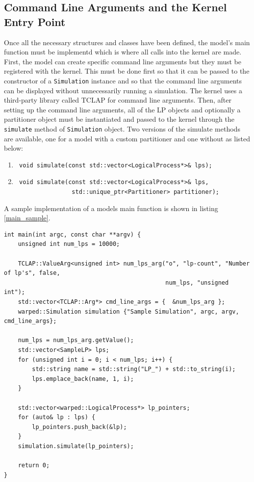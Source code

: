 \documentclass[11pt]{book}
\begin{document}
\subsection{Command Line Arguments and the Kernel Entry Point}

Once all the necessary structures and classes have been defined, the model's main function
must be implementd which is where all calls into the kernel are made. First, the model can create
specific command line arguments but they must be registered with the kernel. This must be done
first so that it can be passed to the constructor of a \texttt{Simulation} instance and so that
the command line arguments can be displayed without unnecessarily running a simulation. The
kernel uses a third-party library called TCLAP for command line arguments. Then, after setting
up the command line arguments, all of the LP objects and optionally a partitioner object must
be instantiated and passed to the kernel through the \texttt{simulate} method of
\texttt{Simulation} object. Two versions of the simulate methods are available, one for a model
with a custom partitioner and one without as listed below:

\begin{enumerate}
    \item \begin{verbatim} void simulate(const std::vector<LogicalProcess*>& lps); \end{verbatim}
    \item \begin{verbatim} void simulate(const std::vector<LogicalProcess*>& lps,
                std::unique_ptr<Partitioner> partitioner); \end{verbatim}
\end{enumerate}

\noindent
A sample implementation of a models main function is shown in listing \ref{main_sample}.

\begin{lstlisting}[caption=Sample \textsc{warped2} Main Definition, label=main_sample, float]
int main(int argc, const char **argv) {
    unsigned int num_lps = 10000;

    TCLAP::ValueArg<unsigned int> num_lps_arg("o", "lp-count", "Number of lp's", false,
                                              num_lps, "unsigned int");
    std::vector<TCLAP::Arg*> cmd_line_args = {  &num_lps_arg };
    warped::Simulation simulation {"Sample Simulation", argc, argv, cmd_line_args};

    num_lps = num_lps_arg.getValue();
    std::vector<SampleLP> lps;
    for (unsigned int i = 0; i < num_lps; i++) {
        std::string name = std::string("LP_") + std::to_string(i);
        lps.emplace_back(name, 1, i);
    }

    std::vector<warped::LogicalProcess*> lp_pointers;
    for (auto& lp : lps) {
        lp_pointers.push_back(&lp);
    }
    simulation.simulate(lp_pointers);

    return 0;
}
\end{lstlisting}
\end{document}
